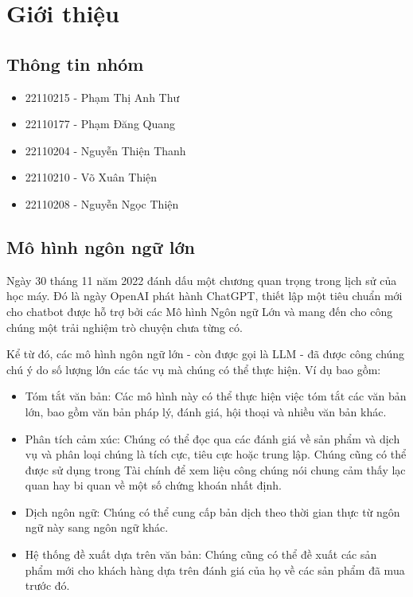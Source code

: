 \chapter{Giới thiệu}
\label{Chapter1}

\section{Thông tin nhóm}

\begin{itemize}
    \item 22110215 - Phạm Thị Anh Thư
    \item 22110177 - Phạm Đăng Quang
    \item 22110204 - Nguyễn Thiện Thanh
    \item 22110210 - Võ Xuân Thiện
    \item 22110208 - Nguyễn Ngọc Thiện
\end{itemize}

\section{Mô hình ngôn ngữ lớn}
Ngày 30 tháng 11 năm 2022 đánh dấu một chương quan trọng trong lịch sử của học máy. Đó là ngày OpenAI phát hành ChatGPT, thiết lập một tiêu chuẩn mới cho chatbot được hỗ trợ bởi các Mô hình Ngôn ngữ Lớn và mang đến cho công chúng một trải nghiệm trò chuyện chưa từng có.

Kể từ đó, các mô hình ngôn ngữ lớn - còn được gọi là LLM - đã được công chúng chú ý do số lượng lớn các tác vụ mà chúng có thể thực hiện. Ví dụ bao gồm:
\begin{itemize}

    \item Tóm tắt văn bản: Các mô hình này có thể thực hiện việc tóm tắt các văn bản lớn, bao gồm văn bản pháp lý, đánh giá, hội thoại và nhiều văn bản khác.

    \item Phân tích cảm xúc: Chúng có thể đọc qua các đánh giá về sản phẩm và dịch vụ và phân loại chúng là tích cực, tiêu cực hoặc trung lập. Chúng cũng có thể được sử dụng trong Tài chính để xem liệu công chúng nói chung cảm thấy lạc quan hay bi quan về một số chứng khoán nhất định.

    \item Dịch ngôn ngữ: Chúng có thể cung cấp bản dịch theo thời gian thực từ ngôn ngữ này sang ngôn ngữ khác.

    \item Hệ thống đề xuất dựa trên văn bản: Chúng cũng có thể đề xuất các sản phẩm mới cho khách hàng dựa trên đánh giá của họ về các sản phẩm đã mua trước đó.
\end{itemize}

